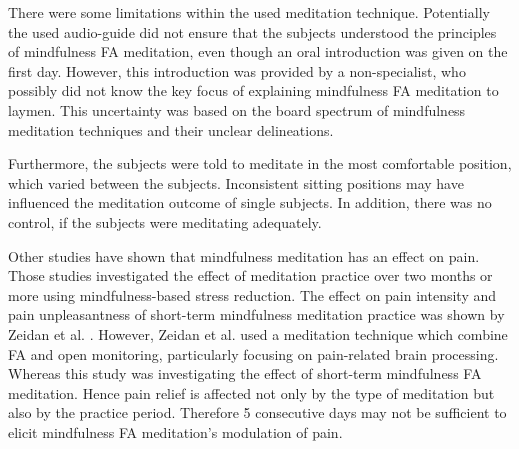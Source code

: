 There were some limitations within the used meditation technique. Potentially the used audio-guide did not ensure that the subjects understood the principles of mindfulness FA meditation, even though an oral introduction was given on the first day. However, this introduction was provided by a non-specialist, who possibly did not know the key focus of explaining mindfulness FA meditation to laymen. This uncertainty was based on the board spectrum of mindfulness meditation techniques and their unclear delineations. 

Furthermore, the subjects were told to meditate in the most comfortable position, which varied between the subjects. Inconsistent sitting positions may have influenced the meditation outcome of single subjects. In addition, there was no control, if the subjects were meditating adequately.

Other studies have shown that mindfulness meditation has an effect on pain. Those studies investigated the effect of meditation practice over two months or more using mindfulness-based stress reduction. \cite{Kabat1982,Rosenzweig2010} The effect on pain intensity and pain unpleasantness of short-term mindfulness meditation practice was shown by Zeidan et al. \cite{Zeidan2012}. However, Zeidan et al. \cite{Zeidan2012} used a meditation technique which combine FA and open monitoring, particularly focusing on pain-related brain processing. Whereas this study was investigating the effect of short-term mindfulness FA meditation. Hence pain relief is affected not only by the type of meditation but also by the practice period. Therefore 5 consecutive days may not be sufficient to elicit mindfulness FA meditation’s modulation of pain.